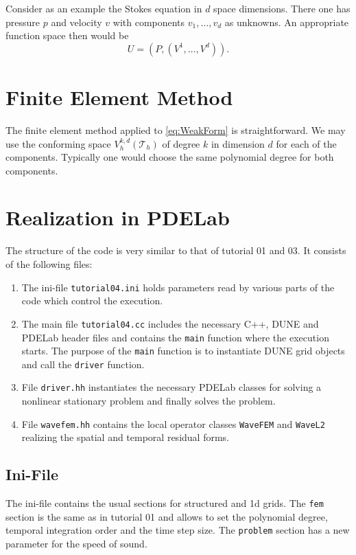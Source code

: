 \documentclass[a4paper,12pt]{article}
\begin{document}
Consider as an example the Stokes equation in $d$ space dimensions.
There one has pressure $p$ and velocity $v$ with components $v_1,\ldots,v_d$
as unknowns. An appropriate function space then would be
$$ U = (P,(V^1,\ldots,V^d)).$$

\section{Finite Element Method}

The finite element method applied to \eqref{eq:WeakForm} is straightforward.
We may use the conforming space $V_h^{k,d}(\mathcal{T}_h)$ of degree $k$ 
in dimension $d$ for each of the components. Typically one would choose
the same polynomial degree for both components.

\section{Realization in PDELab}

The structure of the code is very similar to that of tutorial 01 and 03. 
It consists of the following files:
\begin{enumerate}[1)]
\item The ini-file
\lstinline{tutorial04.ini} holds parameters read by various parts of the code
which control the execution. 
\item The main file \lstinline{tutorial04.cc} includes the necessary C++,
DUNE and PDELab header files
and contains the \lstinline{main} function where the execution starts. 
The purpose of the \lstinline{main} function is
to instantiate DUNE grid objects and call the \lstinline{driver} function.
\item File \lstinline{driver.hh} instantiates the necessary PDELab classes 
for solving a nonlinear stationary problem and finally solves the problem.
\item File \lstinline{wavefem.hh} contains the local operator classes
\lstinline{WaveFEM} and \lstinline{WaveL2} realizing the spatial
and temporal residual forms.
\end{enumerate}

\subsection{Ini-File}

The ini-file contains the usual sections for structured and 1d grids. The
\lstinline{fem} section is the same as in tutorial 01 and allows to set
the polynomial degree, temporal integration order and the time step size.
The \lstinline{problem} section has a new parameter for the speed of sound.

\end{document}
